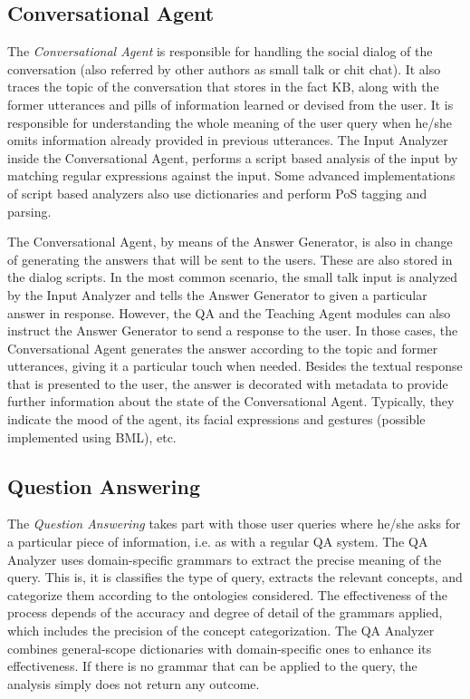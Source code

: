 \subsection{Conversational Agent}

The {\em Conversational Agent} is responsible for handling the social dialog of the conversation (also referred by other authors as small talk or chit chat). It also traces the topic of the conversation that stores in the fact \ac{KB}, along with the former utterances and pills of information learned or devised from the user. It is responsible for understanding the whole meaning of the user query when he/she omits information already provided in previous utterances. 
The Input Analyzer inside the Conversational Agent, performs a script based analysis of the input by matching regular expressions against the input. Some advanced implementations of script based analyzers also use dictionaries and perform \ac{PoS} tagging and parsing.

The Conversational Agent, by means of the Answer Generator, is also in change of generating the answers that will be sent to the users. These are also stored in the dialog scripts. 
In the most common scenario, the small talk input is analyzed by the Input Analyzer and tells the Answer Generator to given a particular answer in response.
However, the \ac{QA} and the Teaching Agent modules can also instruct the Answer Generator to send a response to the user.
In those cases, the Conversational Agent generates the answer according to the topic and former utterances, giving it a particular touch when needed.
Besides the textual response that is presented to the user, the answer is decorated with metadata to provide further information about the state of the Conversational Agent. Typically, they indicate the mood of the agent, its facial expressions and gestures (possible implemented using \ac{BML}), etc.


\subsection{Question Answering}

The {\em Question Answering} takes part with those user queries where he/she asks for a particular piece of information, i.e. as with a regular \ac{QA} system. 
The QA Analyzer uses domain-specific grammars to extract the precise meaning of the query.
This is, it is classifies the type of query, extracts the relevant concepts, and categorize them according to the ontologies considered. The effectiveness of the process depends of the accuracy and degree of detail of the grammars applied, which includes the precision of the concept categorization. The QA Analyzer combines general-scope dictionaries with domain-specific ones to enhance its effectiveness. If there is no grammar that can be applied to the query, the analysis simply does not return any outcome.

